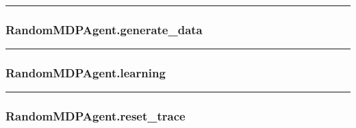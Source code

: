 \begin{center}\rule{0.5\linewidth}{\linethickness}\end{center}

\hypertarget{randommdpagent.generate_data}{%
\subsubsection{RandomMDPAgent.generate\_data}\label{randommdpagent.generate_data}}

\begin{Shaded}
\begin{Highlighting}[]
\end{Highlighting}
\end{Shaded}

\begin{center}\rule{0.5\linewidth}{\linethickness}\end{center}

\hypertarget{randommdpagent.learning}{%
\subsubsection{RandomMDPAgent.learning}\label{randommdpagent.learning}}

\begin{Shaded}
\begin{Highlighting}[]
\end{Highlighting}
\end{Shaded}

\begin{center}\rule{0.5\linewidth}{\linethickness}\end{center}

\hypertarget{randommdpagent.reset_trace}{%
\subsubsection{RandomMDPAgent.reset\_trace}\label{randommdpagent.reset_trace}}

\begin{Shaded}
\begin{Highlighting}[]
\OperatorTok{=}\NormalTok{)}
\end{Highlighting}
\end{Shaded}

